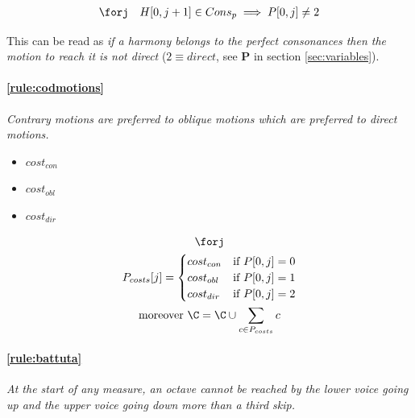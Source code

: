 \begin{equation}
    \begin{gathered}
        \forj\quad
        H[0, j+1] \in Cons_{p} \implies P[0, j] \neq 2
    \end{gathered}
\end{equation}

This can be read as \emph{if a harmony belongs to the perfect consonances then the motion to reach it is not direct} ($2 \equiv direct$, see \textbf{P} in section \ref{sec:variables}).

\paragraph{\ref{rule:codmotions}} \textit{Contrary motions are preferred to oblique motions which are preferred to direct motions.}

\begin{multicols}{3}
    \begin{itemize}
        \item $cost_{con}$\\ 
        \item $cost_{obl}$\\ 
        \item $cost_{dir}$\\ 
    \end{itemize}
\end{multicols}

\begin{equation}
    \begin{gathered}
        \forj\\
        P_{costs}[j] = \begin{cases}
            cost_{con} & \text{if } P[0, j] = 0\\
            cost_{obl} & \text{if } P[0, j] = 1\\
            cost_{dir} & \text{if } P[0, j] = 2
        \end{cases}\\
        \text{moreover } \C = \C \cup \sum _{c \in P_{costs}} c
    \end{gathered}
\end{equation}

\paragraph{\ref{rule:battuta}} \textit{At the start of any measure, an octave cannot be reached by the lower voice going up and the upper voice going down more than a third skip.}

